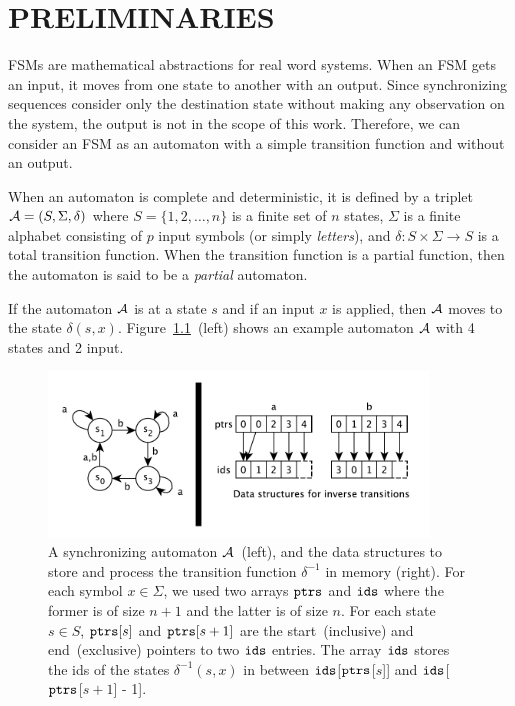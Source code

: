 \chapter{PRELIMINARIES}
\label{sec:Preliminaries}

FSMs are mathematical abstractions for real word systems. When an FSM gets an input, it moves from one state to another with an output. Since synchronizing sequences consider only the destination state without making any observation on the system, the output is not in the scope of this work. Therefore, we can consider an FSM as an automaton with a simple transition function and without an output.

When an automaton is complete and deterministic, it is defined by a triplet ${\cal A}=(S, \Sigma, \delta)$  where $S = \{1, 2, \ldots, n\}$ is a finite set of $n$ states, $\Sigma$ is a finite alphabet consisting of $p$ input symbols (or simply {\em letters}), and $\delta : S \times \Sigma \rightarrow S$ is a total transition function. When the transition function is a partial function, then the automaton is said to be a {\em partial} automaton.

If the automaton ${\cal A}$ is at a state $s$ and if an input $x$ is applied, then ${\cal A}$ moves to the state $\delta(s,x)$. Figure~\ref{fig:inv}~(left) shows an example automaton ${\cal A}$ with 4 states and 2 input.

\begin{figure}[ht]
	\centering
	\includegraphics[width=0.9\textwidth]{figs/inverse.pdf}
	\caption{A synchronizing automaton ${\cal A}$~(left), and the data structures to store and process the transition function $\delta^{-1}$  in memory (right). For each symbol $x \in \Sigma$, we used two arrays ${\tt ptrs}$ and ${\tt ids}$ where the former is of size $n + 1$ and the latter is of size $n$. For each state $s \in S$, ${\tt ptrs}[s]$ and ${\tt ptrs}[s+1]$ are the start~(inclusive) and end~(exclusive) pointers to two ${\tt ids}$ entries.  The array ${\tt ids}$ stores the ids of the states $\delta^{-1}(s,x)$ in between ${\tt ids}$[{$\tt ptrs$}[$s$]]  and ${\tt ids}$[{$\tt ptrs$}[$s+1$] - 1].}
	\label{fig:inv}
\end{figure}

